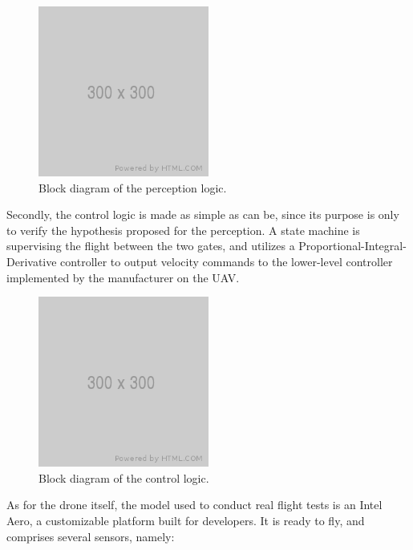 \begin{figure}[h]
	\centering
	\includegraphics[width=0.5\textwidth]{figure/300x300.png}
	\caption{Block diagram of the perception logic.}
	\label{fig:iros}
\end{figure}

Secondly, the control logic is made as simple as can be, since its purpose is
only to verify the hypothesis proposed for the perception. A state machine is
supervising the flight between the two gates, and utilizes a
Proportional-Integral-Derivative controller to output velocity commands to the
lower-level controller implemented by the manufacturer on the UAV.\\

\begin{figure}[h]
	\centering
	\includegraphics[width=0.5\textwidth]{figure/300x300.png}
	\caption{Block diagram of the control logic.}
	\label{fig:iros}
\end{figure}


As for the drone itself, the model used to conduct real flight tests is an Intel
Aero, a customizable platform built for developers. It is ready to fly, and
comprises several sensors, namely:

